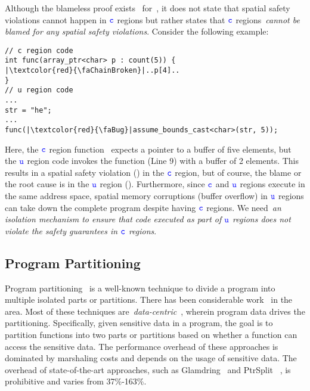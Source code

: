 Although the blameless proof exists~\cite{ruef2019achieving, li22checkedc} for~\checkedc, it does not state that spatial safety violations cannot happen in $\textcolor{blue}{\texttt{c}}$ regions but rather states that $\textcolor{blue}{\texttt{c}}$ regions~\emph{cannot be blamed for any spatial safety violations}.
Consider the following example:
\begin{verbatim}
// c region code
int func(array_ptr<char> p : count(5)) {
|\textcolor{red}{\faChainBroken}|..p[4]..
}
// u region code
...
str = "he";
...
func(|\textcolor{red}{\faBug}|assume_bounds_cast<char>(str, 5)); 
\end{verbatim}
Here, the $\textcolor{blue}{\texttt{c}}$ region function~ expects a pointer to a buffer of five elements, but the $\textcolor{blue}{\texttt{u}}$ region code
invokes the function (Line 9) with a buffer of 2 elements.
This results in a spatial safety violation (\textcolor{red}{\faChainBroken}) in the $\textcolor{blue}{\texttt{c}}$ region, but of course, the blame or the root cause is in the $\textcolor{blue}{\texttt{u}}$ region (\textcolor{red}{\faBug}).
Furthermore, since $\textcolor{blue}{\texttt{c}}$ and $\textcolor{blue}{\texttt{u}}$ regions execute in the same address space, spatial memory corruptions (\eg buffer overflow) in $\textcolor{blue}{\texttt{u}}$ regions can take down the complete program despite having $\textcolor{blue}{\texttt{c}}$ regions.
We need~\emph{an isolation mechanism to ensure that code executed as part of $\textcolor{blue}{\texttt{u}}$  regions does not violate the safety guarantees in $\textcolor{blue}{\texttt{c}}$ regions}.

\subsection{Program Partitioning}
\label{subsec:background:programpart}
Program partitioning~\cite{rul2009towards} is a well-known technique to divide a program into multiple isolated parts or partitions.
There has been considerable work~\cite{tan2017principles, brumley2004privtrans, bittau2008wedge, lind2017glamdring, liu2017ptrsplit} in the area.
Most of these techniques are~\emph{data-centric}~\cite{lind2017glamdring, liu2017ptrsplit}, wherein program data drives the partitioning.
Specifically, given sensitive data in a program, the goal is to partition functions into two parts or partitions based on whether a function can access the sensitive data.
The performance overhead of these approaches is dominated by marshaling costs and depends on the usage of sensitive data.
The overhead of state-of-the-art approaches, such as Glamdring~\cite{lind2017glamdring} and  PtrSplit~
\cite{liu2017ptrsplit}, is prohibitive and varies from 37\%-163\%.
\fi
\iffalse

